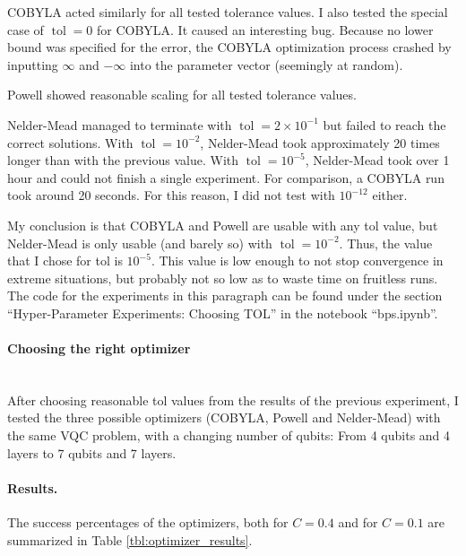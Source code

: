 \documentclass[a4paper,12pt]{article}
\newcommand{\e}[1]{ 10^{#1}}
\DeclareMathOperator{\tol}{tol}
\begin{document}
COBYLA acted similarly for all tested tolerance values.
I also tested the special case of $\tol=0$ for COBYLA. It caused an interesting bug. Because no lower bound was specified for the error, the COBYLA optimization process crashed by inputting $\infty$ and $-\infty$ into the parameter vector (seemingly at random).

Powell showed reasonable scaling for all tested tolerance values.

Nelder-Mead managed to terminate with $\tol=2 \times \e{-1}$ but failed to reach the correct solutions.
With $\tol=\e{-2}$, Nelder-Mead took approximately 20 times longer than with the previous value.
With $\tol=\e{-5}$, Nelder-Mead took over 1 hour and could not finish a single experiment. For comparison, a COBYLA run took around 20 seconds.
For this reason, I did not test with $\e{-12}$ either.

My conclusion is that COBYLA and Powell are usable with any tol value, but Nelder-Mead is only usable (and barely so) with $\tol=\e{-2}$.
Thus, the value that I chose for tol is $\e{-5}$. This value is low enough to not stop convergence in extreme situations, but probably not so low as to waste time on fruitless runs.
The code for the experiments in this paragraph can be found under the section ``Hyper-Parameter Experiments: Choosing TOL'' in the notebook ``bps.ipynb''.

\paragraph*{Choosing the right optimizer}~\\
After choosing reasonable tol values from the results of the previous experiment, I tested the three possible optimizers (COBYLA, Powell and Nelder-Mead) with the same VQC problem, with a changing number of qubits:
From 4 qubits and 4 layers to 7 qubits and 7 layers.

\paragraph*{Results.}
The success percentages of the optimizers, both for $C=0.4$ and for $C=0.1$ are summarized in Table \ref{tbl:optimizer_results}.
\end{document}
